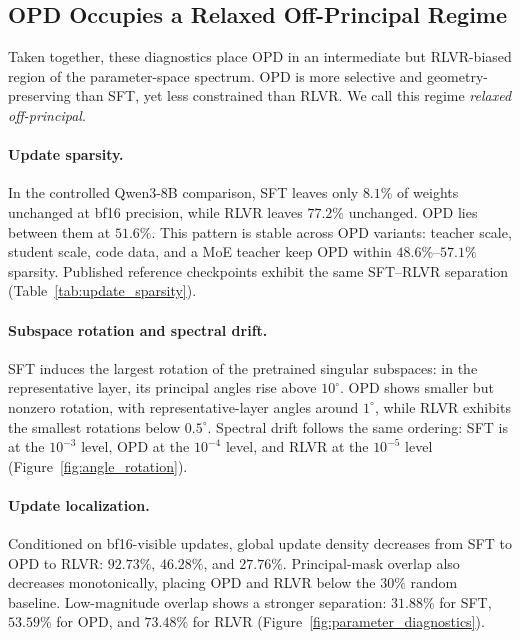 
\subsection{OPD Occupies a Relaxed Off-Principal Regime}

Taken together, these diagnostics place OPD in an intermediate but
RLVR-biased region of the parameter-space spectrum. OPD is more selective
and geometry-preserving than SFT, yet less constrained than RLVR. We call
this regime \emph{relaxed off-principal}.

\paragraph{Update sparsity.}
In the controlled Qwen3-8B comparison, SFT leaves only $8.1\%$ of weights
unchanged at bf16 precision, while RLVR leaves $77.2\%$ unchanged.
OPD lies between them at $51.6\%$. This pattern is stable across OPD
variants: teacher scale, student scale, code data, and a MoE teacher keep
OPD within $48.6\%$--$57.1\%$ sparsity. Published reference checkpoints
exhibit the same SFT--RLVR separation (Table~\ref{tab:update_sparsity}).

\paragraph{Subspace rotation and spectral drift.}
SFT induces the largest rotation of the pretrained singular subspaces:
in the representative layer, its principal angles rise above $10^\circ$.
OPD shows smaller but nonzero rotation, with representative-layer angles
around $1^\circ$, while RLVR exhibits the smallest rotations below
$0.5^\circ$. Spectral drift follows the same ordering: SFT is at the
$10^{-3}$ level, OPD at the $10^{-4}$ level, and RLVR at the $10^{-5}$
level (Figure~\ref{fig:angle_rotation}).

\paragraph{Update localization.}
Conditioned on bf16-visible updates, global update density decreases from
SFT to OPD to RLVR: $92.73\%$, $46.28\%$, and $27.76\%$. Principal-mask
overlap also decreases monotonically, placing OPD and RLVR below the
$30\%$ random baseline. Low-magnitude overlap shows a stronger separation:
$31.88\%$ for SFT, $53.59\%$ for OPD, and $73.48\%$ for RLVR
(Figure~\ref{fig:parameter_diagnostics}).

